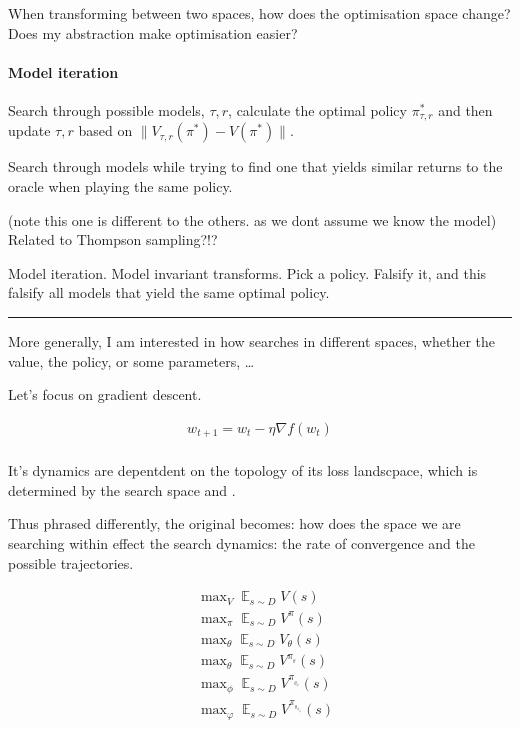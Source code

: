 When transforming between two spaces, how does the optimisation space
change? Does my abstraction make optimisation easier?


\paragraph{Model iteration}

Search through possible models, \(\tau, r\), calculate the optimal
policy \(\pi^{* }_{\tau, r}\) and then update \(\tau, r\) based on
\(\parallel V_{\tau, r}(\pi^{* }) - V(\pi^{* }) \parallel\).

Search through models while trying to find one that yields similar
returns to the oracle when playing the same policy.

(note this one is different to the others. as we dont assume we know the
model) Related to Thompson sampling?!?

Model iteration. Model invariant transforms. Pick a policy. Falsify it,
and this falsify all models that yield the same optimal policy.

\begin{center}\rule{0.5\linewidth}{\linethickness}\end{center}

More generally, I am interested in how searches in different spaces,
whether the value, the policy, or some parameters, \ldots{}

Let's focus on gradient descent.

\begin{align}
w_{t+1} = w_t - \eta \nabla f(w_t) \\
\end{align}

It's dynamics are depentdent on the topology of its loss landscpace,
which is determined by the search space and .

Thus phrased differently, the original becomes: how does the space we
are searching within effect the search dynamics: the rate of convergence
and the possible trajectories.

\begin{align}
&\mathop{\text{max}}_V \mathop{\mathbb E}_{s\sim D} V(s) \\
&\mathop{\text{max}}_{\pi} \mathop{\mathbb E}_{s\sim D}V^{\pi}(s) \\
&\mathop{\text{max}}_{\theta} \mathop{\mathbb E}_{s\sim D} V_{\theta}(s) \\
&\mathop{\text{max}}_{\theta} \mathop{\mathbb E}_{s\sim D} V^{\pi_{_{\theta}}}(s) \\
&\mathop{\text{max}}_{\phi} \mathop{\mathbb E}_{s\sim D} V^{\pi_{_{\theta_{\phi}}}}(s) \\
&\mathop{\text{max}}_{\varphi} \mathop{\mathbb E}_{s\sim D} V^{\pi_{_{\theta_{\phi_{\varphi}}}}}(s) \\
\end{align}

